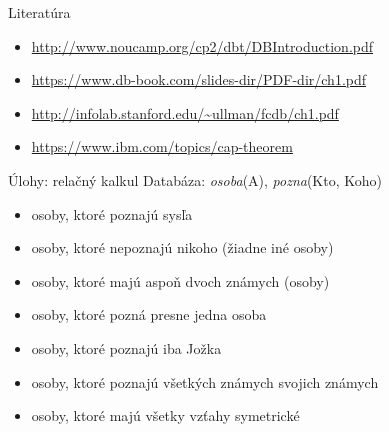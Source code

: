 \documentclass[12pt]{beamer}
\begin{document}
\begin{frame}{Literatúra}
\begin{itemize}
\item {\scriptsize\url{http://www.noucamp.org/cp2/dbt/DBIntroduction.pdf}}
\item {\scriptsize\url{https://www.db-book.com/slides-dir/PDF-dir/ch1.pdf}}
\item {\scriptsize\url{http://infolab.stanford.edu/~ullman/fcdb/ch1.pdf}}
\item {\scriptsize\url{https://www.ibm.com/topics/cap-theorem}}
\end{itemize}
\end{frame}


\begin{frame}{Úlohy: relačný kalkul}
Databáza: \emph{osoba}(A), \emph{pozna}(Kto, Koho)
\begin{itemize}
    \item osoby, ktoré poznajú sysľa
    \item osoby, ktoré nepoznajú nikoho (žiadne iné osoby)
    \item osoby, ktoré majú aspoň dvoch známych (osoby)
    \item osoby, ktoré pozná presne jedna osoba
    \item osoby, ktoré poznajú iba Jožka
    \item osoby, ktoré poznajú všetkých známych svojich známych
    \item osoby, ktoré majú všetky vzťahy symetrické
\end{itemize}
\end{frame}
\end{document}
